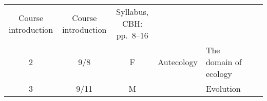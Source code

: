 \documentclass[]{article}
\begin{document}
\begin{longtable}[]{@{}cccllll@{}}
\begin{minipage}[t]{0.10\columnwidth}
Course introduction\strut
\end{minipage} & \begin{minipage}[t]{0.11\columnwidth}\raggedright\strut
Course introduction\strut
\end{minipage} & \begin{minipage}[t]{0.11\columnwidth}\raggedright\strut
Syllabus, CBH: pp.~8--16\strut
\end{minipage} & \begin{minipage}[t]{0.16\columnwidth}\raggedright\strut
\strut
\end{minipage}\tabularnewline
\begin{minipage}[t]{0.12\columnwidth}\centering\strut
2\strut
\end{minipage} & \begin{minipage}[t]{0.08\columnwidth}\centering\strut
9/8\strut
\end{minipage} & \begin{minipage}[t]{0.07\columnwidth}\centering\strut
F\strut
\end{minipage} & \begin{minipage}[t]{0.10\columnwidth}\raggedright\strut
Autecology\strut
\end{minipage} & \begin{minipage}[t]{0.11\columnwidth}\raggedright\strut
The domain of ecology\strut
\end{minipage} & \begin{minipage}[t]{0.11\columnwidth}\raggedright\strut
\strut
\end{minipage} & \begin{minipage}[t]{0.16\columnwidth}\raggedright\strut
\strut
\end{minipage}\tabularnewline
\begin{minipage}[t]{0.12\columnwidth}\centering\strut
3\strut
\end{minipage} & \begin{minipage}[t]{0.08\columnwidth}\centering\strut
9/11\strut
\end{minipage} & \begin{minipage}[t]{0.07\columnwidth}\centering\strut
M\strut
\end{minipage} & \begin{minipage}[t]{0.10\columnwidth}\raggedright\strut
\strut
\end{minipage} & \begin{minipage}[t]{0.11\columnwidth}\raggedright\strut
Evolution\strut
\end{minipage} & \begin{minipage}[t]{0.11\columnwidth}\raggedright\strut

\end{minipage}
\end{longtable}
\end{document}
